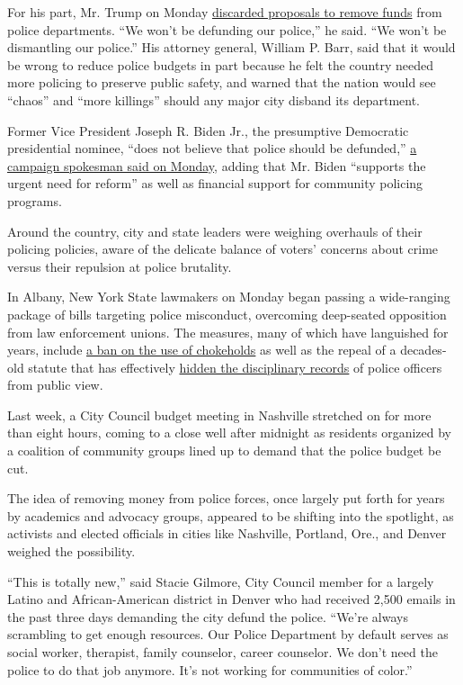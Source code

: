 For his part, Mr. Trump on Monday
\href{https://www.nytimes.com/2020/06/08/us/politics/defund-police-trump.html}{discarded
proposals to remove funds} from police departments. ``We won't be
defunding our police,'' he said. ``We won't be dismantling our police.''
His attorney general, William P. Barr, said that it would be wrong to
reduce police budgets in part because he felt the country needed more
policing to preserve public safety, and warned that the nation would see
``chaos'' and ``more killings'' should any major city disband its
department.

Former Vice President Joseph R. Biden Jr., the presumptive Democratic
presidential nominee, ``does not believe that police should be
defunded,''
\href{https://www.nytimes.com/2020/06/08/us/politics/biden-defund-the-police.html}{a
campaign spokesman said on Monday}, adding that Mr. Biden ``supports the
urgent need for reform'' as well as financial support for community
policing programs.

Around the country, city and state leaders were weighing overhauls of
their policing policies, aware of the delicate balance of voters'
concerns about crime versus their repulsion at police brutality.

In Albany, New York State lawmakers on Monday began passing a
wide-ranging package of bills targeting police misconduct, overcoming
deep-seated opposition from law enforcement unions. The measures, many
of which have languished for years, include
\href{https://www.nysenate.gov/legislation/bills/2019/s6670/amendment/b}{a
ban on the use of chokeholds} as well as the repeal of a decades-old
statute that has effectively
\href{https://www.nytimes.com/2020/06/05/nyregion/police-misconduct-records-are-secret-protests-may-finally-change-that.html}{hidden
the disciplinary records} of police officers from public view.

Last week, a City Council budget meeting in Nashville stretched on for
more than eight hours, coming to a close well after midnight as
residents organized by a coalition of community groups lined up to
demand that the police budget be cut.

The idea of removing money from police forces, once largely put forth
for years by academics and advocacy groups, appeared to be shifting into
the spotlight, as activists and elected officials in cities like
Nashville, Portland, Ore., and Denver weighed the possibility.

``This is totally new,'' said Stacie Gilmore, City Council member for a
largely Latino and African-American district in Denver who had received
2,500 emails in the past three days demanding the city defund the
police. ``We're always scrambling to get enough resources. Our Police
Department by default serves as social worker, therapist, family
counselor, career counselor. We don't need the police to do that job
anymore. It's not working for communities of color.''

